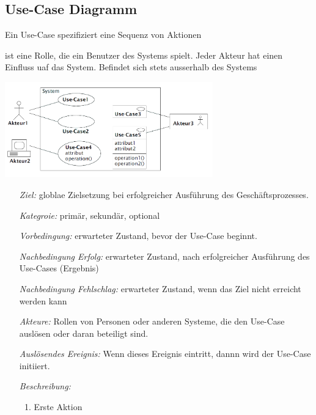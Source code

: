 \subsection{Use-Case Diagramm }
	Ein Use-Case spezifiziert eine Sequenz von Aktionen
	\begin{description}[leftmargin=2cm]
		\item[Akteur]
      \parbox{6cm}{
        ist eine Rolle, die ein Benutzer des Systems spielt. Jeder Akteur hat einen 
        Einfluss uaf das System. Befindet sich stets ausserhalb des Systems}
      \hspace{0.5cm}
      \parbox{9cm}{\includegraphics[width=9cm]{./bilder/UseCase_Notation.png}}
    \item[Schablone]
      \begin{itemize}[leftmargin=4cm]
        \item[\textit{Ziel:}]
          globlae Zielsetzung bei erfolgreicher Ausführung des Geschäftsprozesses.
        \item[\textit{Kategroie:}]
          primär, sekundär, optional
        \item[\textit{Vorbedingung:}]
          erwarteter Zustand, bevor der Use-Case beginnt.
        \item[\textit{Nachbedingung Erfolg:}]
          erwarteter Zustand, nach erfolgreicher Ausführung des Use-Cases (Ergebnis)
        \item[\textit{Nachbedingung Fehlschlag:}]
          erwarteter Zustand, wenn das Ziel nicht erreicht werden kann
        \item[\textit{Akteure:}]
          Rollen von Personen oder anderen Systeme, die den Use-Case auslösen
          oder daran beteiligt sind.
        \item[\textit{Auslösendes Ereignis:}]
          Wenn dieses Ereignis eintritt, dannn wird der Use-Case initiiert.
        \item[\textit{Beschreibung:}]
          \begin{enumerate}[leftmargin=0.5cm]
            \item Erste Aktion

\end{enumerate}
\end{itemize}
\end{description}
